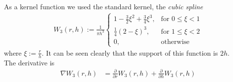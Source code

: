 \documentclass{sigchi}
\begin{document}
\par\medskip
%
As a kernel function we used the standard kernel, the \emph{cubic spline}
\begin{align*}
	W_3(r,h) := \frac{1}{\pi h^3}
	\begin{cases}
		1 - \frac{3}{2} \xi^2 + \frac{3}{4} \xi^3, &\text{for } 0 \le \xi < 1 \\
		\frac{1}{4} (2-\xi)^3, &\text{for } 1 \le \xi < 2 \\
		0, &\text{otherwise}
	\end{cases}
\end{align*}
%
where $\xi := \frac{r}{h}$. It can be seen clearly that the support of this function is $2h$. \\
The derivative is
%
\begin{align*}
	\nabla W_3(r,h) &= \frac{\partial}{\partial r} W_3(r,h) + \frac{\partial}{\partial h} W_3(r,h)
\end{align*}
%
\end{document}
